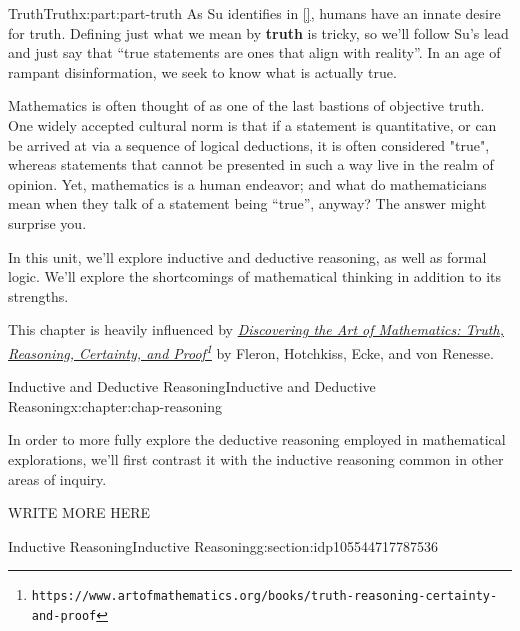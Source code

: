 \documentclass[oneside,10pt,]{book}
\newcommand{\xreffont}{\relax}
\newcommand{\terminology}[1]{\textbf{#1}}
\numberwithin{equation}{section}
\begin{document}
\begin{partptx}{Truth}{}{Truth}{}{}{x:part:part-truth}
 As Su identifies in \hyperlink{x:biblio:Su2020}{[{\xreffont 1}]}, humans have an innate desire for truth. Defining just what we mean by \terminology{truth} is tricky, so we'll follow Su's lead and just say that ``true statements are ones that align with reality''. In an age of rampant disinformation, we seek to know what is actually true.%
\par
Mathematics is often thought of as one of the last bastions of objective truth. One widely accepted cultural norm is that if a statement is quantitative, or can be arrived at via a sequence of logical deductions, it is often considered "true", whereas statements that cannot be presented in such a way live in the realm of opinion. Yet, mathematics is a human endeavor; and what do mathematicians mean when they talk of a statement being ``true'', anyway? The answer might surprise you.%
\par
In this unit, we'll explore inductive and deductive reasoning, as well as formal logic. We'll explore the shortcomings of mathematical thinking in addition to its strengths.%
\par
This chapter is heavily influenced by \emph{\href{https://www.artofmathematics.org/books/truth-reasoning-certainty-and-proof}{Discovering the Art of Mathematics: Truth, Reasoning, Certainty, and Proof}\footnote{\nolinkurl{https://www.artofmathematics.org/books/truth-reasoning-certainty-and-proof}\label{g:fn:idp105544717785488}}} by Fleron, Hotchkiss, Ecke, and von Renesse.%
%
\typeout{************************************************}
\typeout{************************************************}
%
\begin{chapterptx}{Inductive and Deductive Reasoning}{}{Inductive and Deductive Reasoning}{}{}{x:chapter:chap-reasoning}
\begin{introduction}{}%
In order to  more fully explore the deductive reasoning employed in mathematical explorations, we'll first contrast it with the inductive reasoning common in other areas of inquiry.%
\par
WRITE MORE HERE%
\end{introduction}%
%
%
\typeout{************************************************}
\typeout{************************************************}
%
\begin{sectionptx}{Inductive Reasoning}{}{Inductive Reasoning}{}{}{g:section:idp105544717787536}

\end{sectionptx}
\end{chapterptx}
\end{partptx}
\end{document}
